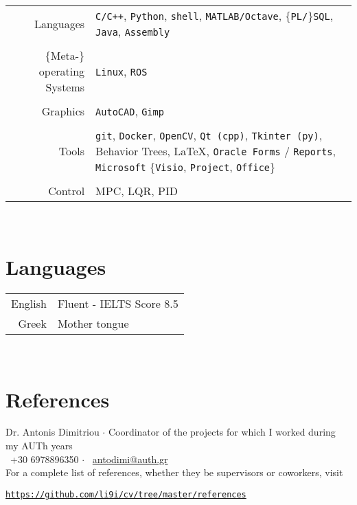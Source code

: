 \documentclass[a4paper,10pt,twoside]{article}
\begin{document}
\begin{tabular}{rp{9cm}}
  Languages & \texttt{C/C++}, \texttt{Python}, \texttt{shell}, \texttt{MATLAB/Octave}, $\{$\texttt{PL/}$\}$\texttt{SQL}, \texttt{Java}, \texttt{Assembly}\\
&\\
  $\{$Meta-$\}$operating Systems & \texttt{Linux}, \texttt{ROS} \\
&\\
  Graphics & \texttt{AutoCAD}, \texttt{Gimp}\\
&\\
  Tools & \texttt{git}, \texttt{Docker}, \texttt{OpenCV}, \texttt{Qt (cpp)}, \texttt{Tkinter (py)}, Behavior Trees, \LaTeX, \texttt{Oracle Forms} / \texttt{Reports}, \texttt{Microsoft} $\{$\texttt{Visio}, \texttt{Project}, \texttt{Office}$\}$ \\
&\\
  Control & MPC, LQR, PID
\end{tabular}\\


\section{Languages}

\begin{tabular}{rp{12cm}}
English & Fluent - IELTS Score 8.5\\
Greek & Mother tongue
\end{tabular}\\

\section{References}
\noindent Dr. Antonis Dimitriou $\cdot$ Coordinator of the projects for which I worked during my AUTh years \\
\faPhone \ +30 6978896350 $\cdot$ \faEnvelopeO \ \href{mailto:antodimi@auth.gr}{antodimi@auth.gr} \\

\noindent For a complete list of references, whether they be supervisors or coworkers, visit
\begin{center}\noindent
\href{https://github.com/li9i/cv/tree/master/references}{\texttt{https://github.com/li9i/cv/tree/master/references}}
\end{center}

\vspace*{\fill}
\end{document}
